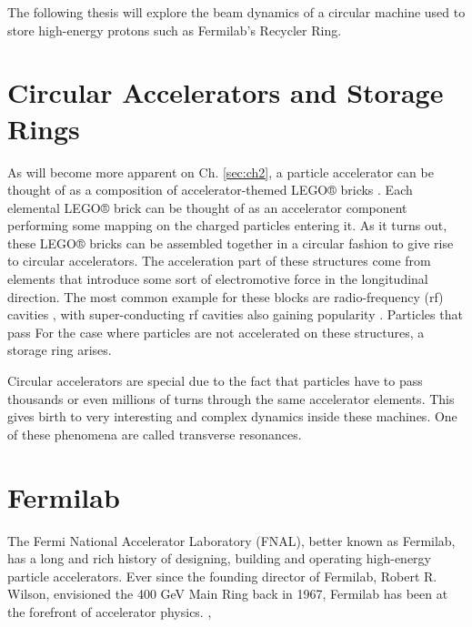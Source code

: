 The following thesis will explore the beam dynamics of a circular machine used to store high-energy protons such as Fermilab's Recycler Ring.         

\section{Circular Accelerators and Storage Rings}

As will become more apparent on Ch. \ref{sec:ch2}, a particle accelerator can be thought of as a composition of accelerator-themed LEGO® bricks \cite{forest}. Each elemental LEGO® brick can be thought of as an accelerator component performing some mapping on the charged particles entering it. As it turns out, these LEGO® bricks can be assembled together in a circular fashion to give rise to circular accelerators. The acceleration part of these structures come from elements that introduce some sort of electromotive force in the longitudinal direction. The most common example for these blocks are radio-frequency (rf) cavities \cite{sylee}, with super-conducting rf cavities also gaining popularity \cite{srfcavs}. Particles that pass For the case where particles are not accelerated on these structures, a storage ring arises.     

Circular accelerators are special due to the fact that particles have to pass thousands or even millions of turns through the same accelerator elements. This gives birth to very interesting and complex dynamics inside these machines. One of these phenomena are called transverse resonances.     

\section{Fermilab}

The Fermi National Accelerator Laboratory (FNAL), better known as Fermilab, has a long and rich history of designing, building and operating high-energy particle accelerators. Ever since the founding director of Fermilab, Robert R. Wilson, envisioned the 400 GeV Main Ring back in 1967, Fermilab has been at the forefront of accelerator physics.     \cite{tevatron},\cite{fermilab1}


